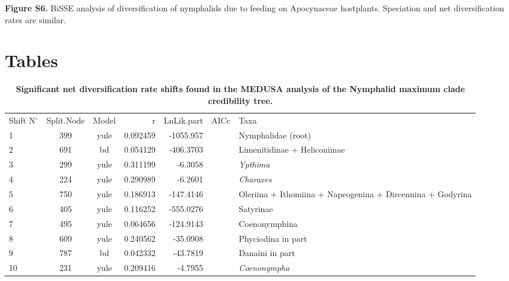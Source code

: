 \documentclass[10pt]{article}
\begin{document}
{\textbf{Figure S6.}} BiSSE analysis of diversification of nymphalids
due to feeding on Apocynaceae hostplants. Speciation and net
diversification rates are similar.

\section*{Tables}
\begin{table}[!h]
\caption{\bf{Significant net diversification rate shifts found in the MEDUSA analysis of the Nymphalid maximum clade credibility tree.}}
\begin{tabular}{lccrrcl}
Shift N$^\circ$ & Split.Node & Model & r          & LnLik.part & AICc     & Taxa                                                       \\
1               & 399        & yule  & 0.092459   & -1055.957  &          & Nymphalidae (root)                                         \\
2               & 691        & bd    & 0.054129   & -406.3703  &          & Limenitidinae + Heliconiinae                               \\
3               & 299        & yule  & 0.311199   & -6.3058    &          & \emph{Ypthima}                                             \\
4               & 224        & yule  & 0.290989   & -6.2601    &          & \emph{Charaxes}                                            \\
5               & 750        & yule  & 0.186913   & -147.4146  &          & Oleriina + Ithomiina + Napeogenina + Dircennina + Godyrina \\
6               & 405        & yule  & 0.116252   & -555.0276  &          & Satyrinae                                                   \\
7               & 495        & yule  & 0.064656   & -124.9143  &          & Coenonymphina                                              \\
8               & 609        & yule  & 0.240562   & -35.0908   &          & Phyciodina in part                                         \\
9               & 787        & bd    & 0.042332   & -43.7819   &          & Danaini in part                                            \\
10              & 231        & yule  & 0.209416   & -4.7955    &          & \emph{Coenonympha}                                         \\

\end{tabular}
\end{table}
\end{document}
